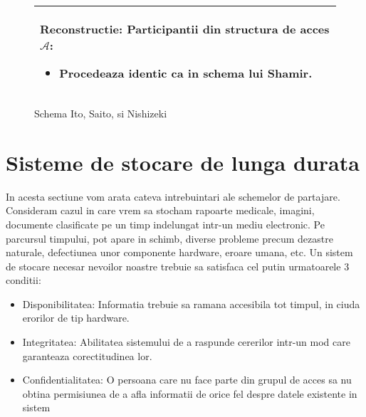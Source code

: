 \documentclass{llncs}
\begin{document}
\begin{figure*}[h!]
\begin{tabular}{|p{\textwidth}|}
\hspace{.1in}
\textbf{Reconstructie}: Participantii din structura de acces $\mathcal{A}$:
	\begin{itemize}
		\item Procedeaza identic ca in schema lui Shamir.
	\end{itemize}


\\
\hline
\end{tabular}

\caption{Schema Ito, Saito, si Nishizeki \cite{ITO:1989}}
\label{fig:ito_et_al}
\end{figure*}





\section{Sisteme de stocare de lunga durata}

In acesta sectiune vom arata cateva intrebuintari ale schemelor de partajare. Consideram cazul in care vrem sa stocham rapoarte medicale, imagini, documente clasificate pe un timp indelungat intr-un mediu electronic. Pe parcursul timpului, pot apare in schimb, diverse probleme precum dezastre naturale, defectiunea unor componente hardware, eroare umana, etc. \cite{SGMV:2009}
Un sistem de stocare necesar nevoilor noastre trebuie sa satisfaca cel putin urmatoarele 3 conditii:
\begin{itemize}
	\item Disponibilitatea: Informatia trebuie sa ramana accesibila tot timpul, in ciuda erorilor de tip hardware.
	\item Integritatea: Abilitatea sistemului de a raspunde cererilor intr-un mod care garanteaza corectitudinea lor.
	\item Confidentialitatea: O persoana care nu face parte din grupul de acces sa nu obtina permisiunea de a afla informatii de orice fel despre datele existente in sistem
\end{itemize}
\end{document}
